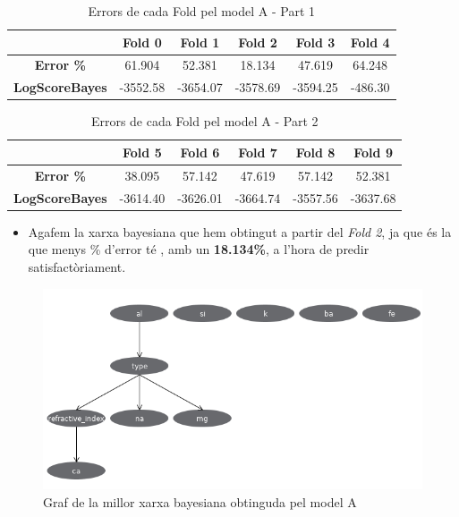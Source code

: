 \documentclass[11pt,a4paper]{article}
\begin{document}
\begin{table}[htbp]
\center
\begin{tabular}{|c||c|c|c|c|c|}
\hline
 & Fold 0 & Fold 1 & Fold 2 & Fold 3 & Fold 4 \\
\hline \hline
\textbf{Error \%}
 & 61.904 & 52.381 & 18.134 & 47.619 & 64.248\\
\hline
\textbf{LogScoreBayes} 
 & -3552.58 & -3654.07 & -3578.69 & -3594.25 & -486.30  \\
\hline
\end{tabular}
\caption{Errors de cada Fold pel model A - Part 1}
\end{table}

\vspace*{0.5in}

\begin{table}[htbp]
\center
\begin{tabular}{|c||c|c|c|c|c|}
\hline
 & Fold 5 & Fold 6 & Fold 7 & Fold 8 & Fold 9 \\
\hline \hline
\textbf{Error \%}
 & 38.095 & 57.142 & 47.619 & 57.142 & 52.381\\
\hline
\textbf{LogScoreBayes} 
 & -3614.40 & -3626.01 & -3664.74 & -3557.56 & -3637.68 \\
\hline
\end{tabular}
\caption{Errors de cada Fold pel model A - Part 2}
\end{table}

\vspace*{0.5in}
\begin{itemize}
\item Agafem la xarxa bayesiana que hem obtingut a partir del \textit{Fold 2}, ja que és la que menys \% d'error té , amb un \textbf{18.134\%}, a l'hora de predir satisfactòriament.
\end{itemize}
\begin{figure}[hbtp]
\centering
\includegraphics[scale=0.6]{Figures/r4.png}
\caption{Graf de la millor xarxa bayesiana obtinguda pel model A}
\end{figure}
\end{document}
